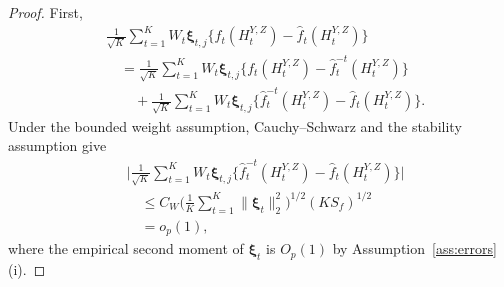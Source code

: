 \documentclass[10pt,a4paper]{amsart}
\begin{document}
\begin{proof}
First,
\begin{align*}
&\frac1{\sqrt K}\sum_{t=1}^K W_t\boldsymbol\xi_{t,j}
\big\{f_t(H_t^{Y,Z})-\hat f_t(H_t^{Y,Z})\big\}\\
&\quad=\frac1{\sqrt K}\sum_{t=1}^K W_t\boldsymbol\xi_{t,j}
\big\{f_t(H_t^{Y,Z})-\hat f_t^{-t}(H_t^{Y,Z})\big\}\\
&\qquad{}+\frac1{\sqrt K}\sum_{t=1}^K W_t\boldsymbol\xi_{t,j}
\big\{\hat f_t^{-t}(H_t^{Y,Z})-\hat f_t(H_t^{Y,Z})\big\}.
\end{align*}
Under the bounded weight assumption, Cauchy--Schwarz and
the stability assumption give
\begin{equation}
\label{eq:outcome-first-deletion-bound}
\begin{aligned}
&\Big|\frac1{\sqrt K}\sum_{t=1}^K W_t\boldsymbol\xi_{t,j}
\big\{\hat f_t^{-t}(H_t^{Y,Z})-\hat f_t(H_t^{Y,Z})\big\}\Big|\\
&\quad\leq C_W
\Big(\frac1K\sum_{t=1}^K\|\boldsymbol\xi_t\|_2^2\Big)^{1/2}
(KS_f)^{1/2}\\
&\quad=o_p(1),
\end{aligned}
\end{equation}
where the empirical second moment of \(\boldsymbol\xi_t\) is
\(O_p(1)\) by Assumption~\ref{ass:errors}(i).


\end{proof}
\end{document}
